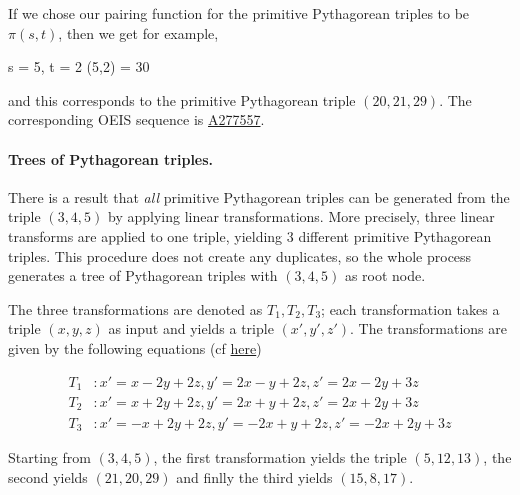 If we chose our pairing function for the primitive Pythagorean triples to be $\pi(s,t)$, then we get for example,

\bee
s = 5, t = 2 \rightarrow(5,2) = 30
\eee

and this corresponds to the primitive Pythagorean triple $(20,21,29)$. The corresponding OEIS sequence is \href{https://oeis.org/A277557}{A277557}.


\paragraph{Trees of Pythagorean triples.} There is a result that \emph{all} primitive Pythagorean triples can be generated from the triple $(3,4,5)$ by applying linear transformations. More precisely, three linear transforms are applied to one triple, yielding $3$ different primitive Pythagorean triples. This procedure does not create any duplicates, so the whole process generates a tree of Pythagorean triples with $(3,4,5)$ as root node.

The three transformations are denoted as $T_1, T_2, T_3$; each transformation takes a triple $(x,y,z)$ as input and yields a triple $(x', y', z')$. The transformations are given by the following equations (cf \href{https://en.m.wikipedia.org/wiki/Pythagorean_triple}{here})

\begin{align}
    T_1&: x' = x - 2y + 2z, y' = 2x-y+2z, z' = 2x-2y+3z \\
    T_2&: x' = x + 2y + 2z, y' = 2x+y+2z, z' = 2x + 2y + 3z \\
    T_3&: x' = -x+2y+2z, y' = -2x+y+2z, z' = -2x + 2y + 3z
\end{align}

Starting from $(3,4,5)$, the first transformation yields the triple $(5, 12, 13)$, the second yields $(21, 20, 29)$ and finlly the third yields $(15, 8, 17)$.


